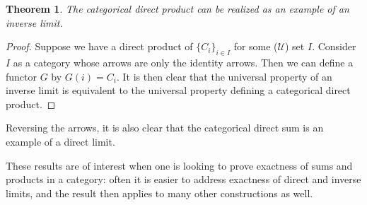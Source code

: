 \documentclass[12pt]{article}
\newtheorem{theorem}{Theorem}
\newcommand{\Univ}{\mathscr{U}}
\begin{document}
\begin{theorem}
The categorical direct product can be realized as an example of an inverse limit.
\end{theorem}
\begin{proof}
Suppose we have a direct product of $\{C_i\}_{i\in I}$ for some ($\Univ$) set $I$. 
Consider $I$ as a category whose arrows are only the identity arrows.  Then we can 
define a functor $G$ by $G(i)=C_i$.  It is then clear that the universal property 
of an inverse limit is equivalent to the universal property defining a categorical 
direct product.
\end{proof}

Reversing the arrows, it is also clear that the categorical direct sum is an example of a direct limit.

These results are of interest when one is looking to prove exactness of sums and products in a category: often it is easier to address exactness of direct and inverse limits, and the result then applies to many other constructions as well.
\end{document}

